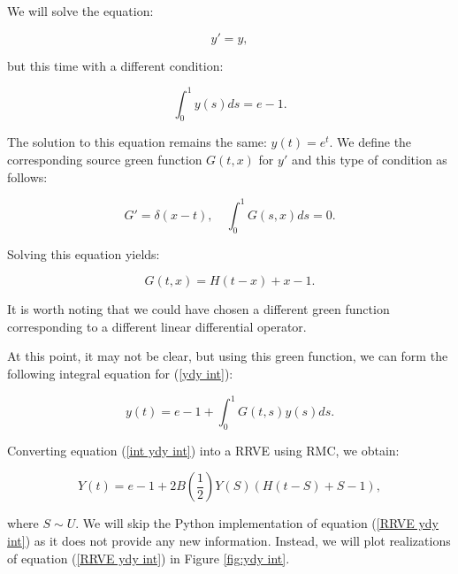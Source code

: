 \documentclass[a4paper,12pt]{article}
\begin{document}
\begin{example}[$y'=y$ average condition]
    We will solve the equation:

    \begin{equation} \label{ydy int}
        y' = y,
    \end{equation}

    but this time with a different condition:

    \begin{equation}
        \int_{0}^{1} y(s) ds = e-1.
    \end{equation}

    The solution to this equation remains the same: $y(t) = e^{t}$.
    We define the corresponding source green function $G(t,x)$ for $y'$
    and this type of condition as follows:

    \begin{equation}
        G' = \delta(x-t), \quad \int_{0}^{1} G(s,x) ds = 0.
    \end{equation}

    Solving this equation yields:

    \begin{equation}
        G(t,x) = H(t-x) + x - 1.
    \end{equation}

    It is worth noting that we could have chosen a different
    green function corresponding to a different linear
    differential operator.

    At this point, it may not be clear, but using this green function,
    we can form the following integral equation for (\ref{ydy int}):

    \begin{equation} \label{int ydy int}
        y(t) = e - 1 + \int_{0}^{1} G(t,s) y(s) ds.
    \end{equation}

    Converting equation (\ref{int ydy int}) into a RRVE
    using RMC, we obtain:

    \begin{equation}\label{RRVE ydy int}
        Y(t) = e - 1 + 2B\left(\frac{1}{2}\right)Y(S)(H(t-S)+S-1),
    \end{equation}

    where $S \sim U$. We will skip the Python implementation
    of equation (\ref{RRVE ydy int}) as it does not provide any
    new information. Instead, we will plot realizations of
    equation (\ref{RRVE ydy int}) in Figure \ref{fig:ydy int}.


\end{example}
\end{document}

